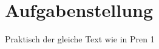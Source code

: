 \documentclass[main.tex]{subfiles} %
\begin{document}

\section{Aufgabenstellung}

Praktisch der gleiche Text wie in Pren 1
\end{document}
